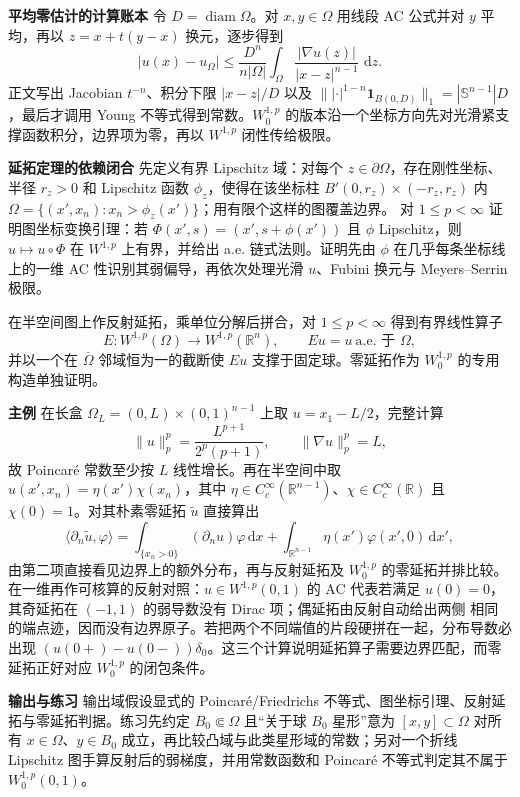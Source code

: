 \documentclass[11pt,a4paper]{ctexart}
\newcommand{\R}{\mathbb R}
\newcommand{\dd}{\,\mathrm d}
\newcommand{\diam}{\operatorname{diam}}
\newcommand{\planitem}[1]{\par\smallskip\noindent\textcolor{deepblue}{\textbf{#1}}\quad}
\begin{document}
\planitem{平均零估计的计算账本}
令 $D=\diam\Omega$。对 $x,y\in\Omega$ 用线段 AC 公式并对 $y$ 平均，再以
$z=x+t(y-x)$ 换元，逐步得到
\[
 |u(x)-u_\Omega|
 \le \frac{D^n}{n|\Omega|}
 \int_\Omega\frac{|\nabla u(z)|}{|x-z|^{n-1}}\,\dd z.
\]
正文写出 Jacobian $t^{-n}$、积分下限 $|x-z|/D$ 以及
$\| |\cdot|^{1-n}\mathbf1_{B(0,D)}\|_1=|\mathbb S^{n-1}|D$，最后才调用 Young 不等式得到常数。$W_0^{1,p}$ 的版本沿一个坐标方向先对光滑紧支撑函数积分，边界项为零，再以 $W^{1,p}$ 闭性传给极限。

\planitem{延拓定理的依赖闭合}
先定义有界 Lipschitz 域：对每个 $z\in\partial\Omega$，存在刚性坐标、半径 $r_z>0$ 和
Lipschitz 函数 $\phi_z$，使得在该坐标柱 $B'(0,r_z)\times(-r_z,r_z)$ 内
$\Omega=\{(x',x_n):x_n>\phi_z(x')\}$；用有限个这样的图覆盖边界。
对 $1\le p<\infty$ 证明图坐标变换引理：若
$\Phi(x',s)=(x',s+\phi(x'))$ 且 $\phi$ Lipschitz，则 $u\mapsto u\circ\Phi$ 在 $W^{1,p}$ 上有界，并给出 a.e. 链式法则。证明先由 $\phi$ 在几乎每条坐标线上的一维 AC 性识别其弱偏导，再依次处理光滑 $u$、Fubini 换元与 Meyers--Serrin 极限。

在半空间图上作反射延拓，乘单位分解后拼合，对 $1\le p<\infty$ 得到有界线性算子
\[
E:W^{1,p}(\Omega)\longrightarrow W^{1,p}(\R^n),
\qquad Eu=u\ \text{a.e. 于 }\Omega,
\]
并以一个在 $\overline\Omega$ 邻域恒为一的截断使 $Eu$ 支撑于固定球。零延拓作为 $W_0^{1,p}$ 的专用构造单独证明。

\planitem{主例}
在长盒 $\Omega_L=(0,L)\times(0,1)^{n-1}$ 上取 $u=x_1-L/2$，完整计算
\[
\|u\|_p^p=\frac{L^{p+1}}{2^p(p+1)},
\qquad \|\nabla u\|_p^p=L,
\]
故 Poincar\'e 常数至少按 $L$ 线性增长。再在半空间中取
$u(x',x_n)=\eta(x')\chi(x_n)$，其中 $\eta\in C_c^\infty(\R^{n-1})$、$\chi\in C_c^\infty(\R)$ 且 $\chi(0)=1$。对其朴素零延拓 $\widetilde u$ 直接算出
\[
\langle\partial_n\widetilde u,\varphi\rangle
=\int_{\{x_n>0\}}(\partial_n u)\varphi\dd x
+\int_{\R^{n-1}}\eta(x')\varphi(x',0)\dd x',
\]
由第二项直接看见边界上的额外分布，再与反射延拓及 $W_0^{1,p}$ 的零延拓并排比较。
在一维再作可核算的反射对照：$u\in W^{1,p}(0,1)$ 的 AC 代表若满足
$u(0)=0$，其奇延拓在 $(-1,1)$ 的弱导数没有 Dirac 项；偶延拓由反射自动给出两侧
相同的端点迹，因而没有边界原子。若把两个不同端值的片段硬拼在一起，分布导数必出现
$(u(0+)-u(0-))\delta_0$。这三个计算说明延拓算子需要边界匹配，而零延拓正好对应
$W_0^{1,p}$ 的闭包条件。

\planitem{输出与练习}
输出域假设显式的 Poincar\'e/Friedrichs 不等式、图坐标引理、反射延拓与零延拓判据。练习先约定
$B_0\Subset\Omega$ 且“关于球 $B_0$ 星形”意为
$[x,y]\subset\Omega$ 对所有 $x\in\Omega$、$y\in B_0$ 成立，再比较凸域与此类星形域的常数；另对一个折线 Lipschitz 图手算反射后的弱梯度，并用常数函数和 Poincar\'e 不等式判定其不属于 $W_0^{1,p}(0,1)$。
\end{document}

